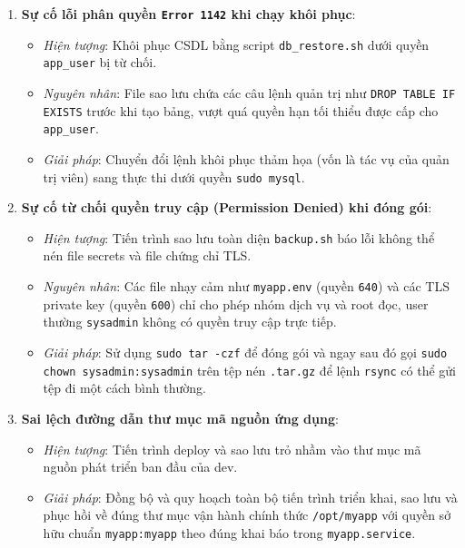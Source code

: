 \documentclass[a4paper,12pt]{article}
\begin{document}
\begin{enumerate}
    \item \textbf{Sự cố lỗi phân quyền \texttt{Error 1142} khi chạy khôi phục}:
    \begin{itemize}
        \item \emph{Hiện tượng}: Khôi phục CSDL bằng script \texttt{db\_restore.sh} dưới quyền \texttt{app\_user} bị từ chối.
        \item \emph{Nguyên nhân}: File sao lưu chứa các câu lệnh quản trị như \texttt{DROP TABLE IF EXISTS} trước khi tạo bảng, vượt quá quyền hạn tối thiểu được cấp cho \texttt{app\_user}.
        \item \emph{Giải pháp}: Chuyển đổi lệnh khôi phục thảm họa (vốn là tác vụ của quản trị viên) sang thực thi dưới quyền \texttt{sudo mysql}.
    \end{itemize}

    \item \textbf{Sự cố từ chối quyền truy cập (Permission Denied) khi đóng gói}:
    \begin{itemize}
        \item \emph{Hiện tượng}: Tiến trình sao lưu toàn diện \texttt{backup.sh} báo lỗi không thể nén file secrets và file chứng chỉ TLS.
        \item \emph{Nguyên nhân}: Các file nhạy cảm như \texttt{myapp.env} (quyền \texttt{640}) và các TLS private key (quyền \texttt{600}) chỉ cho phép nhóm dịch vụ và root đọc, user thường \texttt{sysadmin} không có quyền truy cập trực tiếp.
        \item \emph{Giải pháp}: Sử dụng \texttt{sudo tar -czf} để đóng gói và ngay sau đó gọi \texttt{sudo chown sysadmin:sysadmin} trên tệp nén \texttt{.tar.gz} để lệnh \texttt{rsync} có thể gửi tệp đi một cách bình thường.
    \end{itemize}

    \item \textbf{Sai lệch đường dẫn thư mục mã nguồn ứng dụng}:
    \begin{itemize}
        \item \emph{Hiện tượng}: Tiến trình deploy và sao lưu trỏ nhầm vào thư mục mã nguồn phát triển ban đầu của dev.
        \item \emph{Giải pháp}: Đồng bộ và quy hoạch toàn bộ tiến trình triển khai, sao lưu và phục hồi về đúng thư mục vận hành chính thức \texttt{/opt/myapp} với quyền sở hữu chuẩn \texttt{myapp:myapp} theo đúng khai báo trong \texttt{myapp.service}.
    \end{itemize}
\end{enumerate}
\end{document}
